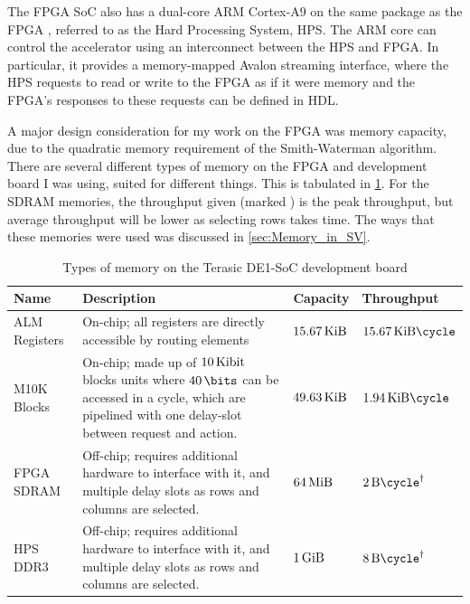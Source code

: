 The FPGA SoC also has a dual-core ARM Cortex-A9 on the same package as the FPGA \cite{CycloneV}, referred to as the Hard Processing System, HPS.
The ARM core can control the accelerator using an interconnect between the HPS and FPGA.
In particular, it provides a memory-mapped Avalon streaming interface, where the HPS requests to read or write to the FPGA as if it were memory and the FPGA’s responses to these requests can be defined in HDL.

A major design consideration for my work on the FPGA was memory capacity, due to the quadratic memory requirement of the Smith-Waterman algorithm.
There are several different types of memory on the FPGA \cite{CycloneV} and development board \cite{DE1-SoC} I was using, suited for different things.
This is tabulated in \cref{tab:FPGA_Memories}.
For the SDRAM memories, the throughput given (marked \dag) is the peak throughput, but average throughput will be lower as selecting rows takes time.
The ways that these memories were used was discussed in \cref{sec:Memory_in_SV}.

\begin{table}[h]
    \centering
    \begin{tabular}{|p{}|p{}p{}p{}|} \hline
        Name & Description & Capacity & Throughput \\ \hline
        ALM Registers & On-chip; all registers are directly accessible by routing elements & $\SI{15.67}{\kibi\byte}$ & $\SI{15.67}{\kibi\byte\cycle}$  \\ \hline
        M10K Blocks & On-chip; made up of $\SI{10}{\kibi\bit}$ blocks units where $\SI{40}{\bits}$ can be accessed in a cycle, which are pipelined with one delay-slot between request and action.  & $\SI{49.63}{\kibi\byte}$ & $\SI{1.94}{\kibi\byte\cycle}$ \\ \hline
        FPGA SDRAM & Off-chip; requires additional hardware to interface with it, and multiple delay slots as rows and columns are selected. & $\SI{64}{\mebi\byte}$
         & $\SI{2}{\byte\cycle}^\dag$ \\ \hline
        HPS DDR3 & Off-chip; requires additional hardware to interface with it, and multiple delay slots as rows and columns are selected. & $\SI{1}{\gibi\byte}$ & $\SI{8}{\byte\cycle}^\dag$ \\ \hline
        \end{tabular}

    \caption{Types of memory on the Terasic DE1-SoC development board}
    \label{tab:FPGA_Memories}
\end{table}

